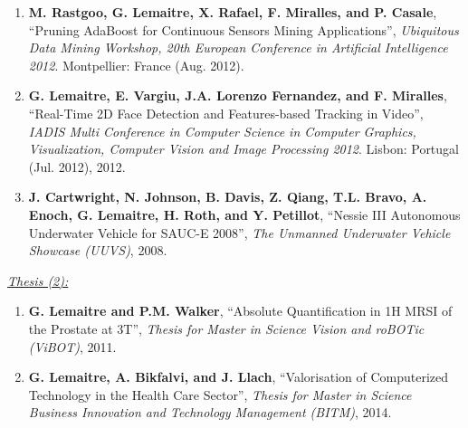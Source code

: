 {\begin{enumerate}
\item \textbf{M. Rastgoo, G. Lemaitre, X. Rafael, F. Miralles, and P. Casale}, ``Pruning AdaBoost for Continuous Sensors Mining Applications'', \textit{Ubiquitous Data Mining Workshop, 20th European Conference in Artificial Intelligence 2012}. Montpellier: France (Aug. 2012).
\item \textbf{G. Lemaitre, E. Vargiu, J.A. Lorenzo Fernandez, and F. Miralles}, ``Real-Time 2D Face Detection and Features-based Tracking in Video'', \textit{IADIS Multi Conference in Computer Science in Computer Graphics, Visualization, Computer Vision and Image Processing 2012}. Lisbon: Portugal (Jul. 2012), 2012.
\item \textbf{J. Cartwright, N. Johnson, B. Davis, Z. Qiang, T.L. Bravo, A. Enoch, G. Lemaitre, H. Roth, and Y. Petillot}, ``Nessie III Autonomous Underwater Vehicle for SAUC-E 2008'', \textit{The Unmanned Underwater Vehicle Showcase (UUVS)}, 2008.
\end{enumerate}

\underline{\textit{Thesis (2):}}

\begin{enumerate}
\item \textbf{G. Lemaitre and P.M. Walker}, ``Absolute Quantification in 1H MRSI of the Prostate at 3T'', \textit{Thesis for Master in Science Vision and roBOTic (ViBOT)}, 2011.
\item \textbf{G. Lemaitre, A. Bikfalvi, and J. Llach}, ``Valorisation of Computerized Technology in the Health Care Sector'', \textit{Thesis for Master in Science Business Innovation and Technology Management (BITM)}, 2014.
\end{enumerate}

}